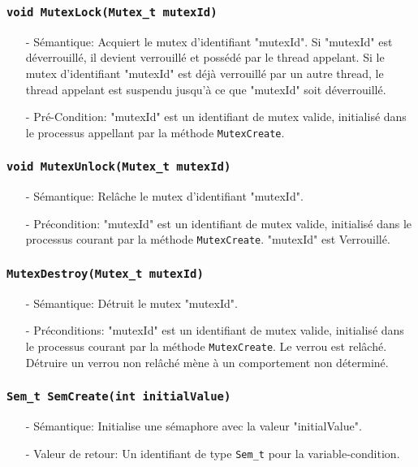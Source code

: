 \documentclass[11pt]{article}
\theoremstyle{definition}
\theoremstyle{definition}
\begin{document}
\subsubsection{\texttt{void MutexLock(Mutex\_t mutexId)}}
\begin{itemize}
\item[-]Sémantique: Acquiert le mutex d'identifiant "mutexId". Si "mutexId" est déverrouillé, il devient verrouillé
  et possédé par le thread appelant. Si le mutex d'identifiant "mutexId" est déjà verrouillé par un autre thread,
  le thread appelant est suspendu jusqu'à ce que "mutexId" soit déverrouillé.
\item[-]Pré-Condition: "mutexId" est un identifiant de mutex valide, initialisé dans le processus
  appellant par la méthode \texttt{MutexCreate}.
\end{itemize}

\subsubsection{\texttt{void MutexUnlock(Mutex\_t mutexId)}}
\begin{itemize}
\item[-]Sémantique: Relâche le mutex d'identifiant "mutexId".
\item[-]Précondition: "mutexId" est un identifiant de mutex valide, initialisé dans le processus
  courant par la méthode \texttt{MutexCreate}. "mutexId" est Verrouillé.
\end{itemize}

\subsubsection{\texttt{MutexDestroy(Mutex\_t mutexId)}}
\begin{itemize}
\item[-]Sémantique: Détruit le mutex "mutexId".
\item[-]Préconditions: "mutexId" est un identifiant de mutex valide, initialisé dans le processus
  courant par la méthode \texttt{MutexCreate}.
  Le verrou est relâché. Détruire un verrou non relâché mène à un comportement
  non déterminé.
\end{itemize}

\subsubsection{\texttt{Sem\_t SemCreate(int initialValue)}}
\begin{itemize}
\item[-]Sémantique: Initialise une sémaphore avec la valeur "initialValue".
\item[-]Valeur de retour: Un identifiant de type \texttt{Sem\_t} pour la variable-condition.
\end{itemize}
\end{document}

